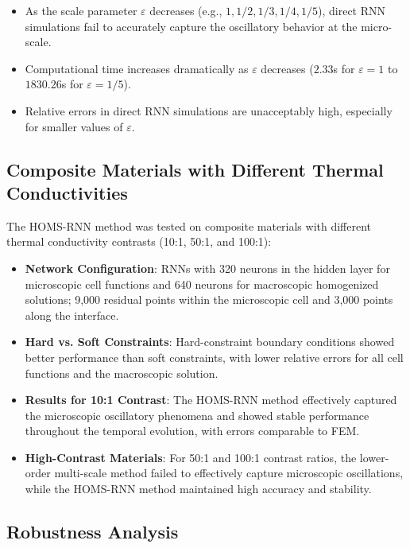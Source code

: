 \documentclass[11pt]{article}
\begin{document}
\begin{itemize}
    \item As the scale parameter $\varepsilon$ decreases (e.g., $1, 1/2, 1/3, 1/4, 1/5$), direct RNN simulations fail to accurately capture the oscillatory behavior at the micro-scale.
    \item Computational time increases dramatically as $\varepsilon$ decreases ($2.33$s for $\varepsilon=1$ to $1830.26$s for $\varepsilon=1/5$).
    \item Relative errors in direct RNN simulations are unacceptably high, especially for smaller values of $\varepsilon$.
\end{itemize}

\subsection{Composite Materials with Different Thermal Conductivities}

The HOMS-RNN method was tested on composite materials with different thermal conductivity contrasts (10:1, 50:1, and 100:1):

\begin{itemize}
    \item \textbf{Network Configuration}: RNNs with 320 neurons in the hidden layer for microscopic cell functions and 640 neurons for macroscopic homogenized solutions; 9,000 residual points within the microscopic cell and 3,000 points along the interface.
    
    \item \textbf{Hard vs. Soft Constraints}: Hard-constraint boundary conditions showed better performance than soft constraints, with lower relative errors for all cell functions and the macroscopic solution.
    
    \item \textbf{Results for 10:1 Contrast}: The HOMS-RNN method effectively captured the microscopic oscillatory phenomena and showed stable performance throughout the temporal evolution, with errors comparable to FEM.
    
    \item \textbf{High-Contrast Materials}: For 50:1 and 100:1 contrast ratios, the lower-order multi-scale method failed to effectively capture microscopic oscillations, while the HOMS-RNN method maintained high accuracy and stability.
\end{itemize}

\subsection{Robustness Analysis}
\end{document}
